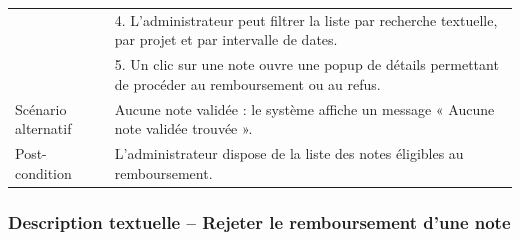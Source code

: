 \documentclass[12pt,a4paper]{report}
\begin{document}
\begin{longtable}{|p{3.5cm}|p{11cm}|}
& 4. L'administrateur peut filtrer la liste par recherche textuelle, par projet et par intervalle de dates. \\

& 5. Un clic sur une note ouvre une popup de détails permettant de procéder au remboursement ou au refus. \\

\hline

Scénario alternatif & Aucune note validée : le système affiche un message « Aucune note validée trouvée ». \\

\hline

Post-condition & L'administrateur dispose de la liste des notes éligibles au remboursement. \\

\hline

\end{longtable}





\subsubsection{Description textuelle – Rejeter le remboursement d'une note}


\label{tab:reject_reimbursement_desc}
\end{document}
